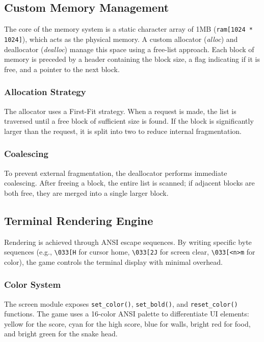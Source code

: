 \documentclass[conference]{IEEEtran}
\begin{document}
\subsection{Custom Memory Management}
The core of the memory system is a static character array of 1MB (\texttt{ram[1024 * 1024]}), which acts as the physical memory. A custom allocator (\textit{alloc}) and deallocator (\textit{dealloc}) manage this space using a free-list approach. Each block of memory is preceded by a header containing the block size, a flag indicating if it is free, and a pointer to the next block.

\subsubsection{Allocation Strategy}
The allocator uses a First-Fit strategy. When a request is made, the list is traversed until a free block of sufficient size is found. If the block is significantly larger than the request, it is split into two to reduce internal fragmentation.

\subsubsection{Coalescing}
To prevent external fragmentation, the deallocator performs immediate coalescing. After freeing a block, the entire list is scanned; if adjacent blocks are both free, they are merged into a single larger block.

\subsection{Terminal Rendering Engine}
Rendering is achieved through ANSI escape sequences. By writing specific byte sequences (e.g., \texttt{\textbackslash 033[H} for cursor home, \texttt{\textbackslash 033[2J} for screen clear, \texttt{\textbackslash 033[<n>m} for color), the game controls the terminal display with minimal overhead.

\subsubsection{Color System}
The screen module exposes \texttt{set\_color()}, \texttt{set\_bold()}, and \texttt{reset\_color()} functions. The game uses a 16-color ANSI palette to differentiate UI elements: yellow for the score, cyan for the high score, blue for walls, bright red for food, and bright green for the snake head.
\end{document}

